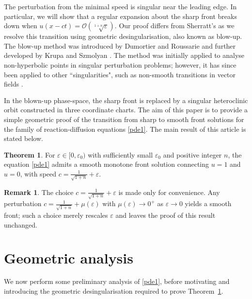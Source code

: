 \documentclass{article}
\theoremstyle{definition}
\numberwithin{equation}{section}
\newtheorem{thm}[prop]{Theorem}
\newtheorem{remark}[prop]{Remark}
\begin{document}
The perturbation from the minimal speed is singular near the leading edge. In particular, we will show that a regular expansion about the sharp front breaks down when $u(x-ct)=\mathcal{O}(\sqrt[1+n]{\varepsilon})$.
Our proof differs from Sherratt's \cite{Sherratt2010} as we resolve this transition using geometric desingularisation, also known as blow-up. The blow-up method was introduced by Dumortier
and Roussarie \cite{DumortierRoussarie1996} and further developed by Krupa and Szmolyan \cite{KrupaSzmolyan2001}. The method was initially applied to analyse non-hyperbolic points in singular perturbation problems; however, it has since been  applied to other ``singularities", such as non-smooth transitions in vector fields \cite{Dumortier_2007}.

In the blown-up phase-space, the sharp front is replaced by a singular heteroclinic orbit constructed in three coordinate charts. The aim of this paper is to provide a simple geometric proof of the transition from sharp to smooth front solutions for the family of reaction-diffusion equations \eqref{pde1}. The main result of this article is stated below.

\begin{thm}
    For $\varepsilon\in[0, \varepsilon_0)$ with sufficiently small $\varepsilon_0$ and positive integer $n$, the equation \eqref{pde1} admits a smooth monotone front solution connecting $u=1$ and $u=0$, with speed $c=\tfrac{1}{\sqrt{1+n}}+\varepsilon$.
    \label{thm:1}
\end{thm}
\begin{remark}
    The choice $c=\tfrac{1}{\sqrt{1+n}}+\varepsilon$ is made only for convenience. Any perturbation $c=\tfrac{1}{\sqrt{1+n}}+\mu(\varepsilon)$ with $\mu(\varepsilon)\to 0^+$ as $\varepsilon\to0$ yields a smooth front; such a choice merely rescales $\varepsilon$ and leaves the proof of this result unchanged.
\end{remark}

\section{Geometric analysis}
We now perform some preliminary analysis of \eqref{pde1}, before motivating and introducing the geometric desingularisation required to prove Theorem~\ref{thm:1}.
\end{document}
